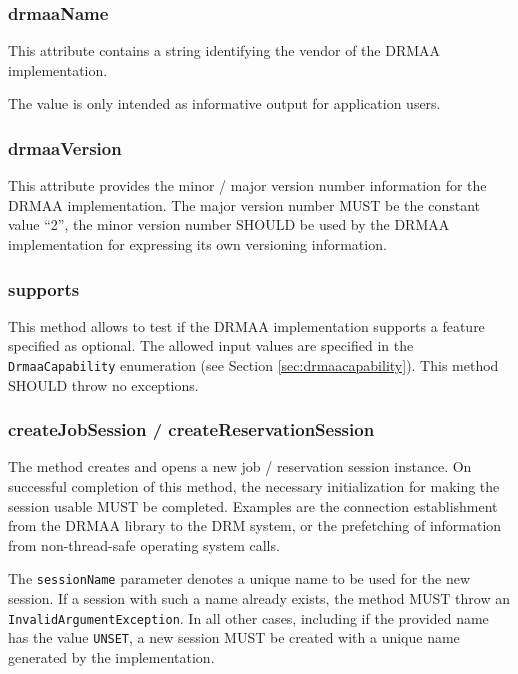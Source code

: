 \documentclass{article}
\newcommand{\h}[1]{\lstinline|#1|}
\begin{document}
\subsubsection{drmaaName}

This attribute contains a string identifying the vendor of the DRMAA implementation.  

The value is only intended as informative output for application users.

\subsubsection{drmaaVersion}

This attribute provides the minor / major version number information for the DRMAA implementation. The major version number MUST be the constant value \enquote{2}, the minor version number SHOULD be used by the DRMAA implementation for expressing its own versioning information.

\subsubsection{supports}
\label{sec:supports}

This method allows to test if the DRMAA implementation supports a feature specified as optional. The allowed input values are specified in the \h{DrmaaCapability} enumeration (see Section \ref{sec:drmaacapability}). This method SHOULD throw no exceptions.

\subsubsection{createJobSession / createReservationSession}
\label{sec:createJobSession}

The method creates and opens a new job / reservation session instance. On successful completion of this method, the necessary initialization for making the session usable MUST be completed. Examples are the connection establishment from the DRMAA library to the DRM system, or the prefetching of information from non-thread-safe operating system calls.

The \h{sessionName} parameter denotes a unique name to be used for the new session. If a session with such a name already exists, the method MUST throw an \h{InvalidArgumentException}. In all other cases, including if the provided name has the value \h{UNSET}, a new session MUST be created with a unique name generated by the implementation. 
\end{document}
